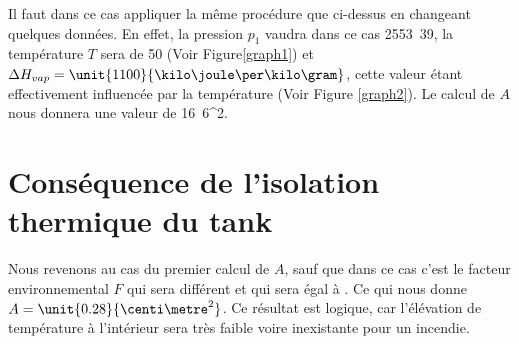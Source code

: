 Il faut dans ce cas appliquer la même procédure que ci-dessus en changeant quelques données. En effet, la pression $p_1$ vaudra dans ce cas \unit{2553.39}{\kilo \pascal}, la température $T$ sera de \unit{50}{\celsius} (Voir Figure\ref{graph1}) et $\Delta H_{vap}=\unit{1100}{\kilo \joule \per \kilo \gram}$, cette valeur étant effectivement influencée par la température (Voir Figure \ref{graph2}). Le calcul de $A$ nous donnera une valeur de \unit{16.6}{\centi \metre^2}.

\section{Conséquence de l'isolation thermique du tank}

Nous revenons au cas du premier calcul de $A$, sauf que dans ce cas c'est le facteur environnemental $F$ qui sera différent et qui sera égal à . Ce qui nous donne $A=\unit{0.28}{\centi \metre^2}$. Ce résultat est logique, car l'élévation de température à l'intérieur sera très faible voire inexistante pour un incendie.
